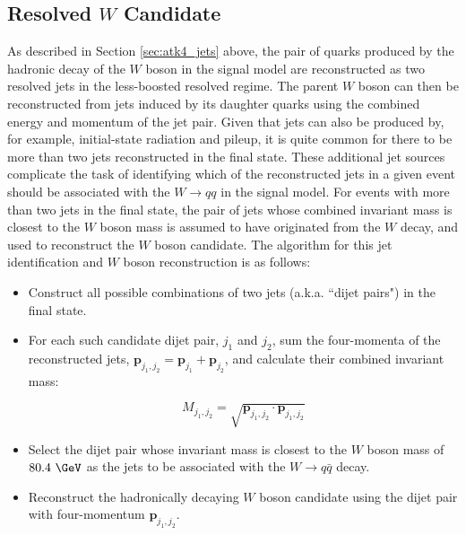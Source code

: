 \subsection{Resolved \(W\) Candidate}
\label{sec:resolved_w_cand}

As described in Section \ref{sec:atk4_jets} above, the pair of quarks produced by the hadronic decay of the \(W\) boson in the signal model are reconstructed as two resolved \smallR jets in the less-boosted resolved regime. The parent \(W\) boson can then be reconstructed from \smallR jets induced by its daughter quarks using the combined energy and momentum of the \smallR jet pair. Given that \smallR jets can also be produced by, for example, initial-state radiation and pileup, it is quite common for there to be more than two \smallR jets reconstructed in the final state. These additional jet sources complicate the task of identifying which of the reconstructed \smallR jets in a given event should be associated with the \(W\rightarrow qq\) in the signal model. For events with more than two \smallR jets in the final state, the pair of \smallR jets whose combined invariant mass is closest to the \(W\) boson mass is assumed to have originated from the \(W\) decay, and used to reconstruct the \(W\) boson candidate. The algorithm for this jet identification and \(W\) boson reconstruction is as follows:

\begin{itemize}
\item Construct all possible combinations of two \smallR jets (a.k.a. ``dijet pairs") in the final state.
\item For each such candidate dijet pair, \(j_1\) and \(j_2\), sum the four-momenta of the reconstructed jets, \(\mathbf{p}_{j_1,j_2} = \mathbf{p}_{j_1} + \mathbf{p}_{j_2}\), and calculate their combined invariant mass: 

\begin{equation}
\label{eq:dijet_invt_mass}
M_{j_1,j_2} = \sqrt{\mathbf{p}_{j_1,j_2} \cdot \mathbf{p}_{j_1,j_2} } 
\end{equation}
\item Select the dijet pair whose invariant mass is closest to the \(W\) boson mass of \(80.4~\GeV\) \cite{pdg_2020} as the \smallR jets to be associated with the \(W\rightarrow q\bar{q}\) decay.
\item Reconstruct the hadronically decaying \(W\) boson candidate using the dijet pair with four-momentum \(\mathbf{p}_{j_1,j_2}\).
\end{itemize}

